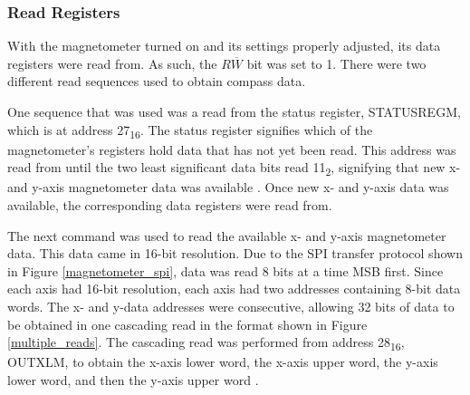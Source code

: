\subsubsection{Read Registers}
With the magnetometer turned on and its settings properly adjusted, its data registers were read from. As such, the $R\overline{W}$ bit was set to 1. There were two different read sequences used to obtain compass data. 
\par
One sequence that was used was a read from the status register, STATUS\textunderscore{}REG\textunderscore{}M, which is at address 27\textsubscript{16}. The status register signifies which of the magnetometer's registers hold data that has not yet been read. This address was read from until the two least significant data bits read 11\textsubscript{2}, signifying that new x- and y-axis magnetometer data was available \cite{lsm9ds1}. Once new x- and y-axis data was available, the corresponding data registers were read from.
\par
The next command was used to read the available x- and y-axis magnetometer data. This data came in 16-bit resolution. Due to the SPI transfer protocol shown in Figure \ref{magnetometer_spi}, data was read 8 bits at a time MSB first. Since each axis had 16-bit resolution, each axis had two addresses containing 8-bit data words. The x- and y-data addresses were consecutive, allowing 32 bits of data to be obtained in one cascading read in the format shown in Figure \ref{multiple_reads}. The cascading read was performed from address 28\textsubscript{16}, OUT\textunderscore{}X\textunderscore{}L\textunderscore{}M, to obtain the x-axis lower word, the x-axis upper word, the y-axis lower word, and then the y-axis upper word \cite{lsm9ds1}.







